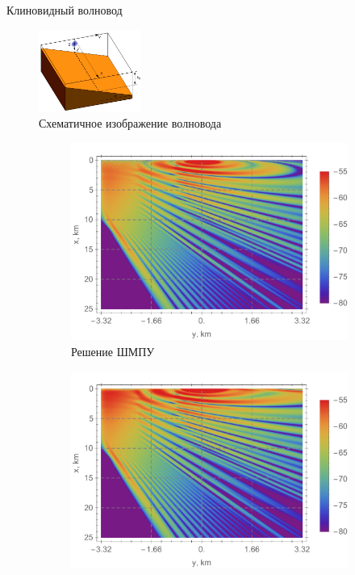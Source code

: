 \documentclass{fefu_presentation}
\begin{document}
     \begin{frame}[fragile]{Клиновидный волновод}
         \vspace{-0.25cm}
         \begin{figure}[h]
             \centering
             \includegraphics[width=0.3\textwidth]{wedge_transparent.png}
             \caption{Схематичное изображение волновода}
         \end{figure}
         \vspace{-0.75cm}
         \begin{figure}[h]
             \centering
             \begin{subfigure}[t]{0.35\textwidth}
                 \centering
                 \includegraphics[width=\textwidth]{wedge_wampe.pdf}
                 \caption{Решение ШМПУ}
             \end{subfigure}
             \begin{subfigure}[t]{0.35\textwidth}
                 \centering
                 \includegraphics[width=\textwidth]{wedge_n13.pdf}

\end{subfigure}
\end{figure}
\end{frame}
\end{document}
